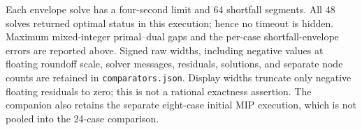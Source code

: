 Each envelope solve has a four-second limit and 64 shortfall segments. All 48 solves returned optimal status in this execution; hence no timeout is hidden. Maximum mixed-integer primal--dual gaps and the per-case shortfall-envelope errors are reported above. Signed raw widths, including negative values at floating roundoff scale, solver messages, residuals, solutions, and separate node counts are retained in \texttt{comparators.json}. Display widths truncate only negative floating residuals to zero; this is not a rational exactness assertion. The companion also retains the separate eight-case initial MIP execution, which is not pooled into the 24-case comparison.
